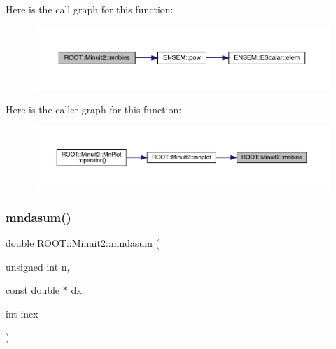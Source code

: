 Here is the call graph for this function\+:
\nopagebreak
\begin{figure}[H]
\begin{center}
\leavevmode
\includegraphics[width=350pt]{d6/d3a/namespaceROOT_1_1Minuit2_ac22433ee68c6274fa7028a58763d04bd_cgraph}
\end{center}
\end{figure}
Here is the caller graph for this function\+:
\nopagebreak
\begin{figure}[H]
\begin{center}
\leavevmode
\includegraphics[width=350pt]{d6/d3a/namespaceROOT_1_1Minuit2_ac22433ee68c6274fa7028a58763d04bd_icgraph}
\end{center}
\end{figure}
\mbox{\label{namespaceROOT_1_1Minuit2_a6945787dc86a55296d0de1bf1fefc508}} 
\subsubsection{\texorpdfstring{mndasum()}{mndasum()}}
{\footnotesize\ttfamily double R\+O\+O\+T\+::\+Minuit2\+::mndasum (\begin{DoxyParamCaption}\item[{unsigned int}]{n,  }\item[{const double $\ast$}]{dx,  }\item[{int}]{incx }\end{DoxyParamCaption})}

